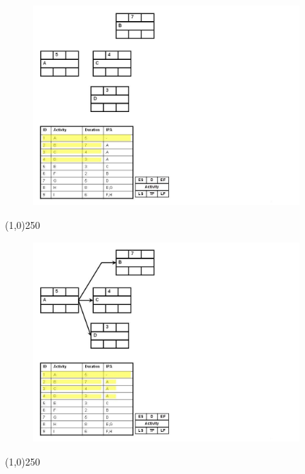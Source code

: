 \begin{frame}
\begin{figure}
	\centering
		\includegraphics[width = 10.0cm]{oldnotes/Slide130.jpg}
\end{figure}
\end{frame}
\begin{center}\line(1,0){250}\end{center}


\begin{frame}
\begin{figure}
	\centering
		\includegraphics[width = 10.0cm]{oldnotes/Slide131.jpg}
\end{figure}
\end{frame}
\begin{center}\line(1,0){250}\end{center}


